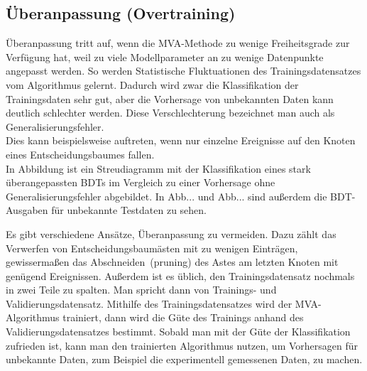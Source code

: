 

\subsection{\"Uberanpassung (Overtraining)}
\label{ch:Algorithmen:subsec:overtraining}

\"Uberanpassung tritt auf, wenn die MVA-Methode zu wenige Freiheitsgrade zur Verf\"ugung hat, weil zu viele Modellparameter an zu wenige Datenpunkte angepasst werden. So werden Statistische Fluktuationen des Trainingsdatensatzes vom Algorithmus gelernt. Dadurch wird zwar die Klassifikation der Trainingsdaten sehr gut, aber die Vorhersage von unbekannten Daten kann deutlich schlechter werden. Diese Verschlechterung bezeichnet man auch als Generalisierungsfehler.\\
Dies kann beispielsweise auftreten, wenn nur einzelne Ereignisse auf den Knoten eines Entscheidungsbaumes fallen.\\
In Abbildung  ist ein Streudiagramm mit der Klassifikation eines stark \"uberangepassten BDTs im Vergleich zu einer Vorhersage ohne Generalisierungsfehler abgebildet. In Abb... und Abb...  sind au\ss erdem die BDT-Ausgaben f\"ur unbekannte Testdaten zu sehen.

Es gibt verschiedene Ans\"atze, \"Uberanpassung zu vermeiden. Dazu z\"ahlt das Verwerfen von Entscheidungsbaum\"asten mit zu wenigen Eintr\"agen, gewisserma\ss en das \glqq Abschneiden\grqq~(pruning) des Astes am letzten Knoten mit gen\"ugend Ereignissen. Au\ss erdem ist es \"ublich, den Trainingsdatensatz nochmals in zwei Teile zu spalten. Man spricht dann von Trainings- und Validierungsdatensatz. Mithilfe des Trainingsdatensatzes wird der MVA-Algorithmus trainiert, dann wird die G\"ute des Trainings anhand des Validierungsdatensatzes bestimmt. Sobald man mit der G\"ute der Klassifikation zufrieden ist, kann man den trainierten Algorithmus nutzen, um Vorhersagen f\"ur unbekannte Daten, zum Beispiel die experimentell gemessenen Daten, zu machen.

